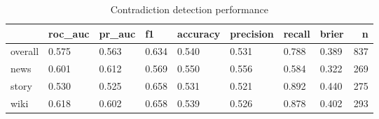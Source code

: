\begin{table}
\caption{Contradiction detection performance}
\label{tab:results}
\begin{tabular}{llllllllr}
\toprule
 & roc_auc & pr_auc & f1 & accuracy & precision & recall & brier & n \\
\midrule
overall & 0.575 & 0.563 & 0.634 & 0.540 & 0.531 & 0.788 & 0.389 & 837 \\
news & 0.601 & 0.612 & 0.569 & 0.550 & 0.556 & 0.584 & 0.322 & 269 \\
story & 0.530 & 0.525 & 0.658 & 0.531 & 0.521 & 0.892 & 0.440 & 275 \\
wiki & 0.618 & 0.602 & 0.658 & 0.539 & 0.526 & 0.878 & 0.402 & 293 \\
\bottomrule
\end{tabular}
\end{table}
